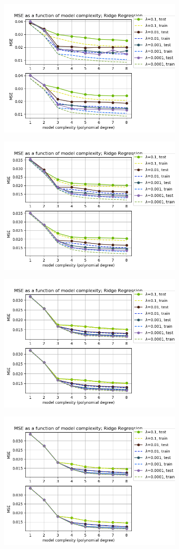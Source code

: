 \begin{figure}[!htbp]
\begin{subfigure}{\textwidth}
  \centering
  \includegraphics[width=0.55\linewidth]{images/mse/fake_ridge_mse_p08_n10.png}
\end{subfigure}
\begin{subfigure}{\textwidth}
  \centering
  \includegraphics[width=0.55\linewidth]{images/mse/fake_ridge_mse_p08_n21.png}
\end{subfigure}
\begin{subfigure}{\textwidth}
  \centering
  \includegraphics[width=0.55\linewidth]{images/mse/fake_ridge_mse_p08_n50.png}
\end{subfigure}
\begin{subfigure}{\textwidth}
  \centering
  \includegraphics[width=0.55\linewidth]{images/mse/fake_ridge_mse_p08_n100.png}

\end{subfigure}
\end{figure}
